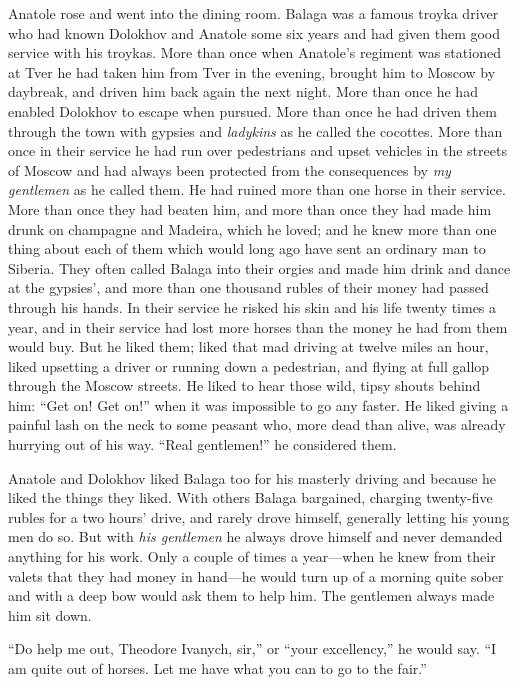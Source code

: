 Anatole rose and went into the dining room. Balaga was a famous
troyka driver who had known Dolokhov and Anatole some six years
and had given them good service with his troykas. More than once
when Anatole's regiment was stationed at Tver he had taken him
from Tver in the evening, brought him to Moscow by daybreak, and
driven him back again the next night. More than once he had
enabled Dolokhov to escape when pursued. More than once he had
driven them through the town with gypsies and \emph{ladykins} as
he called the cocottes. More than once in their service he had
run over pedestrians and upset vehicles in the streets of Moscow
and had always been protected from the consequences by \emph{my
gentlemen} as he called them. He had ruined more than one horse
in their service. More than once they had beaten him, and more
than once they had made him drunk on champagne and Madeira, which
he loved; and he knew more than one thing about each of them
which would long ago have sent an ordinary man to Siberia. They
often called Balaga into their orgies and made him drink and
dance at the gypsies', and more than one thousand rubles of their
money had passed through his hands. In their service he risked
his skin and his life twenty times a year, and in their service
had lost more horses than the money he had from them would
buy. But he liked them; liked that mad driving at twelve miles an
hour, liked upsetting a driver or running down a pedestrian, and
flying at full gallop through the Moscow streets. He liked to
hear those wild, tipsy shouts behind him: ``Get on! Get on!''
when it was impossible to go any faster. He liked giving a
painful lash on the neck to some peasant who, more dead than
alive, was already hurrying out of his way. ``Real gentlemen!''
he considered them.

Anatole and Dolokhov liked Balaga too for his masterly driving
and because he liked the things they liked. With others Balaga
bargained, charging twenty-five rubles for a two hours' drive,
and rarely drove himself, generally letting his young men do
so. But with \emph{his gentlemen} he always drove himself and
never demanded anything for his work. Only a couple of times a
year---when he knew from their valets that they had money in
hand---he would turn up of a morning quite sober and with a deep
bow would ask them to help him. The gentlemen always made him sit
down.

``Do help me out, Theodore Ivanych, sir,'' or ``your
excellency,'' he would say. ``I am quite out of horses. Let me
have what you can to go to the fair.''

